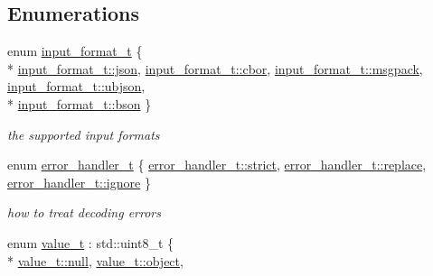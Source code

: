 \subsection*{Enumerations}
\begin{DoxyCompactItemize}
\item 
enum \hyperlink{namespacenlohmann_1_1detail_aa554fc6a11519e4f347deb25a9f0db40}{input\+\_\+format\+\_\+t} \{ \\*
\hyperlink{namespacenlohmann_1_1detail_aa554fc6a11519e4f347deb25a9f0db40a466deec76ecdf5fca6d38571f6324d54}{input\+\_\+format\+\_\+t\+::json}, 
\hyperlink{namespacenlohmann_1_1detail_aa554fc6a11519e4f347deb25a9f0db40aaf9de350d652f0c9055ddab514bd23ea}{input\+\_\+format\+\_\+t\+::cbor}, 
\hyperlink{namespacenlohmann_1_1detail_aa554fc6a11519e4f347deb25a9f0db40ac40d516627022a54003ac2b74a82688a}{input\+\_\+format\+\_\+t\+::msgpack}, 
\hyperlink{namespacenlohmann_1_1detail_aa554fc6a11519e4f347deb25a9f0db40a4537f20910e85437f6d07701864084e8}{input\+\_\+format\+\_\+t\+::ubjson}, 
\\*
\hyperlink{namespacenlohmann_1_1detail_aa554fc6a11519e4f347deb25a9f0db40a0b6879b186bfb2b1ec65d2460e4eccd4}{input\+\_\+format\+\_\+t\+::bson}
 \}\begin{DoxyCompactList}\small\item\em the supported input formats \end{DoxyCompactList}
\item 
enum \hyperlink{namespacenlohmann_1_1detail_a5a76b60b26dc8c47256a996d18d967df}{error\+\_\+handler\+\_\+t} \{ \hyperlink{namespacenlohmann_1_1detail_a5a76b60b26dc8c47256a996d18d967dfa2133fd717402a7966ee88d06f9e0b792}{error\+\_\+handler\+\_\+t\+::strict}, 
\hyperlink{namespacenlohmann_1_1detail_a5a76b60b26dc8c47256a996d18d967dfa9dde360102c103867bd2f45872f1129c}{error\+\_\+handler\+\_\+t\+::replace}, 
\hyperlink{namespacenlohmann_1_1detail_a5a76b60b26dc8c47256a996d18d967dfa567bc1d268f135496de3d5b946b691f3}{error\+\_\+handler\+\_\+t\+::ignore}
 \}\begin{DoxyCompactList}\small\item\em how to treat decoding errors \end{DoxyCompactList}
\item 
enum \hyperlink{namespacenlohmann_1_1detail_a1ed8fc6239da25abcaf681d30ace4985}{value\+\_\+t} \+: std\+::uint8\+\_\+t \{ \\*
\hyperlink{namespacenlohmann_1_1detail_a1ed8fc6239da25abcaf681d30ace4985a37a6259cc0c1dae299a7866489dff0bd}{value\+\_\+t\+::null}, 
\hyperlink{namespacenlohmann_1_1detail_a1ed8fc6239da25abcaf681d30ace4985aa8cfde6331bd59eb2ac96f8911c4b666}{value\+\_\+t\+::object}, 

\end{DoxyCompactItemize}
